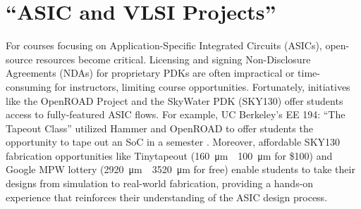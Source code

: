 \section{``ASIC and VLSI Projects''}

For courses focusing on Application-Specific Integrated Circuits (ASICs), open-source resources become critical. Licensing and signing Non-Disclosure Agreements (NDAs) for proprietary PDKs are often impractical or time-consuming for instructors, limiting course opportunities. Fortunately, initiatives like the OpenROAD Project and the SkyWater PDK (SKY130) offer students access to fully-featured ASIC flows. For example, UC Berkeley's EE 194: ``The Tapeout Class'' utilized Hammer and OpenROAD to offer students the opportunity to tape out an SoC in a semester \cite{ZhaoLatchUp}. Moreover, affordable SKY130 fabrication opportunities like Tinytapeout (\SI{160}{\micro\metre}~\texttimes~\SI{100}{\micro\metre} for \$100) \cite{tinytapeoutTinyTapeout} and Google MPW lottery (\SI{2920}{\micro\metre}~\texttimes~\SI{3520}{\micro\metre} for free) \cite{efablessCaravel} enable students to take their designs from simulation to real-world fabrication, providing a hands-on experience that reinforces their understanding of the ASIC design process.
